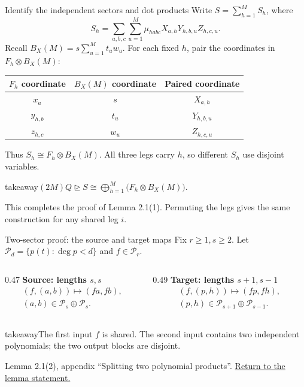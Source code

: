 \documentclass[aspectratio=169,11pt]{beamer}
\newcommand{\degen}{\unrhd}
\newcommand{\source}[1]{\vfill\par{\fontsize{7.5}{9}\selectfont\color{muted}#1\par}}
\newcommand{\takeaway}[1]{\begin{beamercolorbox}[sep=0.65em,wd=\linewidth]{takeaway}#1\end{beamercolorbox}}
\begin{document}
\begin{frame}{Identify the independent sectors and dot products}
  Write $S=\sum_{h=1}^{M}S_h$, where
  \[
    S_h=\sum_{a,b,c}\sum_{u=1}^{M}
      \mu_{habc}X_{a,h}Y_{h,b,u}Z_{h,c,u}.
  \]
  Recall $B_X(M)=s\sum_{u=1}^{M}t_uw_u$.
  For each fixed $h$, pair the coordinates in $F_h\otimes B_X(M)$:
  {\centering
    \renewcommand{\arraystretch}{1.15}
    \begin{tabular}{@{}ccc@{}}
      \toprule
      $F_h$ coordinate & $B_X(M)$ coordinate & Paired coordinate\\
      \midrule
      $x_a$ & $s$ & $X_{a,h}$\\
      $y_{h,b}$ & $t_u$ & $Y_{h,b,u}$\\
      $z_{h,c}$ & $w_u$ & $Z_{h,c,u}$\\
      \bottomrule
    \end{tabular}
    \par}
  Thus $S_h\cong F_h\otimes B_X(M)$.
  All three legs carry $h$, so different $S_h$ use disjoint variables.
  \par\smallskip
  \takeaway{$\displaystyle
    (2M)Q\degen S\cong
      \bigoplus\nolimits_{h=1}^{M}\bigl(F_h\otimes B_X(M)\bigr).
  $}
  \source{This completes the proof of Lemma 2.1(1).
  Permuting the legs gives the same construction for any shared leg $i$.}
\end{frame}

\begin{frame}[label=two-sector-proof]{Two-sector proof: the source and target maps}
  Fix $r\ge1,s\ge2$. Let $\mathcal P_d=\{p(t):\deg p<d\}$
  and $f\in\mathcal P_r$.
  \par\smallskip
  \begin{columns}[T,onlytextwidth]
    \begin{column}{0.47\textwidth}
      \textbf{Source: lengths $s,s$}
      \[
      \begin{gathered}
        (f,(a,b))\longmapsto(fa,fb),\\
        (a,b)\in\mathcal P_s\oplus\mathcal P_s.
      \end{gathered}
      \]
    \end{column}
    \begin{column}{0.49\textwidth}
      \textbf{Target: lengths $s+1,s-1$}
      \[
      \begin{gathered}
        (f,(p,h))\longmapsto(fp,fh),\\
        (p,h)\in\mathcal P_{s+1}\oplus\mathcal P_{s-1}.
      \end{gathered}
      \]
    \end{column}
  \end{columns}
  \takeaway{The first input $f$ is shared. The second input contains two
    independent polynomials; the two output blocks are disjoint.}
  \source{Lemma 2.1(2), appendix ``Splitting two polynomial products''.
  \hyperlink{two-sector-splitting}{Return to the lemma statement.}}
\end{frame}
\end{document}
